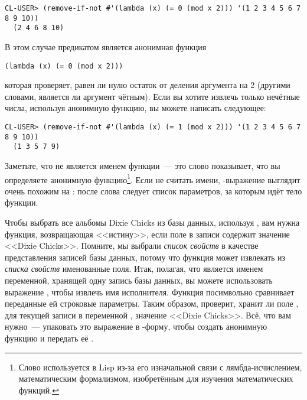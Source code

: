 \begin{lstlisting}[style=lisprepl]
  CL-USER> (remove-if-not #'(lambda (x) (= 0 (mod x 2))) '(1 2 3 4 5 6 7 8 9 10))
  (2 4 6 8 10)
\end{lstlisting}

В этом случае предикатом является анонимная функция

\begin{lstlisting}
(lambda (x) (= 0 (mod x 2)))
\end{lstlisting}

которая проверяет, равен ли нулю остаток от деления аргумента на 2 (другими словами,
является ли аргумент чётным). Если вы хотите извлечь только нечётные числа, используя
анонимную функцию, вы можете написать следующее:

\begin{lstlisting}[style=lisprepl]
  CL-USER> (remove-if-not #'(lambda (x) (= 1 (mod x 2))) '(1 2 3 4 5 6 7 8 9 10))
  (1 3 5 7 9)
\end{lstlisting}

Заметьте, что  не является именем функции~--- это слово показывает, что вы
определяете анонимную функцию\footnote{Слово  используется в Lisp из-за его
  изначальной связи с лямбда-исчислением, математическим формализмом, изобретённым для
  изучения математических функций.}. Если не считать имени, -выражение
выглядит очень похожим на : после слова  следует список
параметров, за которым идёт тело функции.

Чтобы выбрать все альбомы Dixie Chicks из базы данных, используя , вам
нужна функция, возвращающая <<истину>>, если поле в записи  содержит значение
<<Dixie Chicks>>. Помните, мы выбрали \textit{список свойств} в качестве представления
записей базы данных, потому что функция  может извлекать из \textit{списка
  свойств} именованные поля. Итак, полагая, что  является именем переменной,
хранящей одну запись базы данных, вы можете использовать выражение , чтобы извлечь имя исполнителя. Функция  посимвольно сравнивает
переданные ей строковые параметры. Таким образом,  проверит, хранит ли поле , для текущей записи в переменной ,
значение <<Dixie Chicks>>. Всё, что вам нужно~--- упаковать это выражение в
-форму, чтобы создать анонимную функцию и передать её .

